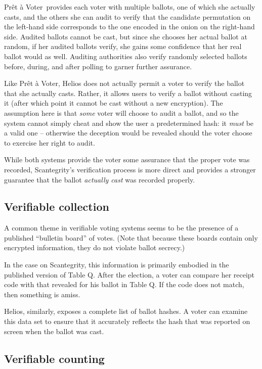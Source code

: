 \documentclass[10pt,twocolumn]{article}
\newcommand{\preta}{Pr\^{e}t \`{a}}
\newcommand{\pv}{\preta{} Voter}
\begin{document}
\pv\ provides each voter with multiple ballots, one of which she actually casts, and the others
she can audit to verify that the candidate permutation on the left-hand side corresponds to the one
encoded in the onion on the right-hand side. Audited ballots cannot be cast, but since she chooses
her actual ballot at random, if her audited ballots verify, she gains some confidence that
her real ballot would as well. Auditing authorities also verify randomly selected ballots before,
during, and after polling to garner further assurance.

Like \pv, Helios does not actually permit a voter to verify the ballot that she actually casts. Rather, it
allows users to verify a ballot without casting it (after which point it cannot be cast without
a new encryption). The assumption here is that \emph{some} voter will choose to audit a ballot, and
so the system cannot simply cheat and show the user a predetermined hash: it \emph{must} be a valid
one -- otherwise the deception would be revealed should the voter choose to exercise her right
to audit.

While both systems provide the voter some assurance that the proper vote was recorded, Scantegrity's
verification process is more direct and provides a stronger guarantee that the ballot \emph{actually
cast} was recorded properly.

\subsection{Verifiable collection}

A common theme in verifiable voting systems seems to be the presence of a published ``bulletin
board'' of votes. (Note that because these boards contain only encrypted information, they do not
violate ballot secrecy.)

In the case on Scantegrity, this information is primarily embodied in the published version of Table
Q. After the election, a voter can compare her receipt code with that revealed for his ballot in
Table Q. If the code does not match, then something is amiss.

Helios, similarly, exposes a complete list of ballot hashes. A voter can examine this data set to
ensure that it accurately reflects the hash that was reported on screen when the ballot was cast.

\subsection{Verifiable counting}
\end{document}
